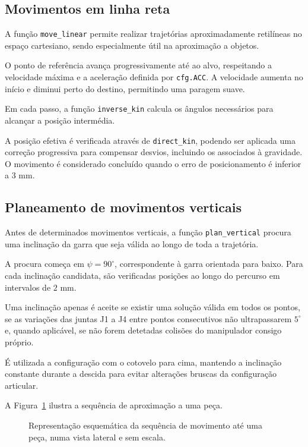 \subsection{Movimentos em linha reta}

A função \texttt{move\_linear} permite realizar trajetórias aproximadamente retilíneas no espaço cartesiano, sendo especialmente útil na aproximação a objetos.

O ponto de referência avança progressivamente até ao alvo, respeitando a velocidade máxima e a aceleração definida por \texttt{cfg.ACC}. A velocidade aumenta no início e diminui perto do destino, permitindo uma paragem suave.

Em cada passo, a função \texttt{inverse\_kin} calcula os ângulos necessários para alcançar a posição intermédia.

A posição efetiva é verificada através de \texttt{direct\_kin}, podendo ser aplicada uma correção progressiva para compensar desvios, incluindo os associados à gravidade. O movimento é considerado concluído quando o erro de posicionamento é inferior a $3$ mm.

\subsection{Planeamento de movimentos verticais}

Antes de determinados movimentos verticais, a função \texttt{plan\_vertical} procura uma inclinação da garra que seja válida ao longo de toda a trajetória.

A procura começa em $\psi=90^\circ$, correspondente à garra orientada para baixo. Para cada inclinação candidata, são verificadas posições ao longo do percurso em intervalos de $2$ mm.

Uma inclinação apenas é aceite se existir uma solução válida em todos os pontos, se as variações das juntas J1 a J4 entre pontos consecutivos não ultrapassarem $5^\circ$ e, quando aplicável, se não forem detetadas colisões do manipulador consigo próprio.

É utilizada a configuração com o cotovelo para cima, mantendo a inclinação constante durante a descida para evitar alterações bruscas da configuração articular.

A Figura~\ref{fig:move} ilustra a sequência de aproximação a uma peça.

\begin{figure}[htbp]
    \centering
    
    \caption{Representação esquemática da sequência de movimento até uma peça, numa vista lateral e sem escala.}
    \label{fig:move}
\end{figure}

